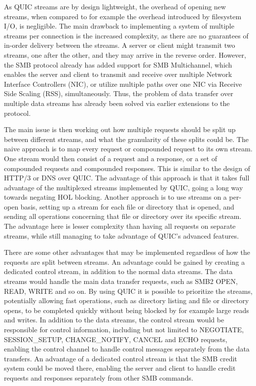 \documentclass[english, 12pt, a4paper, elec, utf8, a-2b, online]{aaltothesis}
\begin{document}
As QUIC streams are by design lightweight, the overhead of opening new streams,
when compared to for example the overhead introduced by filesystem I/O, is
negligible. The main drawback to implementing a system of multiple streams per
connection is the increased complexity, as there are no guarantees of in-order
delivery between the streams. A server or client might transmit two streams, one after the
other, and they may arrive in the reverse order. However, the SMB protocol already
has added support for SMB Multichannel, which enables the server and client to transmit
and receive over multiple Network Interface Controllers (NIC), or utilize multiple
paths over one NIC via Receive Side Scaling (RSS), simultaneously. Thus, the problem
of data transfer over multiple data streams has already been solved via earlier
extensions to the protocol.

The main issue is then working out how multiple requests should be split up between different
streams, and what the granularity of these splits could be. The naive approach
is to map every request or compounded request to its own stream. One stream would then
consist of a request and a response, or a set of compounded requests and compounded
responses. This is similar to the design of HTTP/3 or DNS over QUIC. The advantage
of this approach is that it takes full advantage of
the multiplexed streams implemented by QUIC, going a long way towards negating HOL blocking.
Another approach is to use streams on a per-open basis, setting up a stream
for each file or directory that is opened, and sending all operations concerning that file
or directory over its specific stream. The advantage here is lesser complexity than having
all requests on separate streams, while still managing to take advantage of QUIC's advanced
features.

There are some other advantages that may be implemented regardless of how the requests
are split between streams. An advantage could be gained by creating a
dedicated control stream, in addition to the normal data streams. The data streams
would handle the main data transfer requests, such as SMB2 OPEN, READ, WRITE and
so on. By using QUIC it is possible to prioritize the streams, potentially allowing
fast operations, such as directory listing and file or directory opens, to be completed quickly without
being blocked by for example large reads and writes.
In addition to the data streams, the control stream would be responsible for control information, including
but not limited to NEGOTIATE, SESSION\_SETUP, CHANGE\_NOTIFY, CANCEL and ECHO requests, enabling
the control channel to handle control messages separately from the data
transfers. An advantage of a dedicated control stream is that the SMB credit system
could be moved there, enabling the server and client to handle credit requests
and responses separately from other SMB commands.
\end{document}

